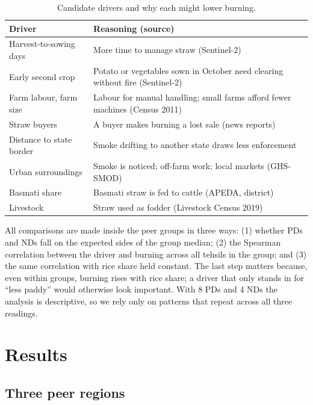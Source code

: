 \documentclass[sigconf,nonacm]{acmart}
\begin{document}
\begin{table}[t]
\caption{Candidate drivers and why each might lower burning.}
\label{tab:drivers}
\small
\begin{tabularx}{\columnwidth}{@{}l >{\raggedright\arraybackslash}X@{}}
\toprule
Driver & Reasoning (source) \\
\midrule
Harvest-to-sowing days & More time to manage straw (Sentinel-2) \\
Early second crop & Potato or vegetables sown in October need clearing without fire (Sentinel-2) \\
Farm labour, farm size & Labour for manual handling; small farms afford fewer machines (Census 2011) \\
Straw buyers & A buyer makes burning a lost sale (news reports) \\
Distance to state border & Smoke drifting to another state draws less enforcement~\cite{dipoppa2024bureaucrat} \\
Urban surroundings & Smoke is noticed; off-farm work; local markets (GHS-SMOD) \\
Basmati share & Basmati straw is fed to cattle (APEDA, district) \\
Livestock & Straw used as fodder (Livestock Census 2019) \\
\bottomrule
\end{tabularx}
\end{table}

All comparisons are made inside the peer groups in three ways: (1) whether PDs and NDs fall on the expected sides of the group median; (2) the Spearman correlation between the driver and burning across all tehsils in the group; and (3) the same correlation with rice share held constant. The last step matters because, even within groups, burning rises with rice share; a driver that only stands in for ``less paddy'' would otherwise look important. With 8 PDs and 4 NDs the analysis is descriptive, so we rely only on patterns that repeat across all three readings.

\section{Results}
\label{sec:results}

\subsection{Three peer regions}
\label{sec:res-groups}
\end{document}
